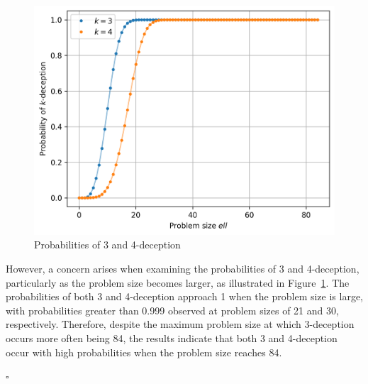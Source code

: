 \documentclass{article}
\begin{document}
\begin{enumerate}[label=(\alph*)]
            \begin{figure}[ht]
                  \centering
                  \includegraphics[width=0.7\linewidth]{fig-deception.png}
                  \caption{Probabilities of 3 and 4-deception}
                  \label{fig:deception_prob}
            \end{figure}

            However, a concern arises when examining the probabilities of 3 and 4-deception, particularly 
            as the problem size becomes larger, as illustrated in Figure~\ref{fig:deception_prob}. 
            The probabilities of both 3 and 4-deception approach 1 when the problem size is large, with probabilities greater 
            than 0.999 observed at problem sizes of 21 and 30, respectively. 
            Therefore, despite the maximum problem size at which 3-deception occurs more often being 84, the results indicate that 
            both 3 and 4-deception occur with high probabilities when the problem size reaches 84.
            

            \hfill $\square$

\end{enumerate}

\vspace{5em}
\end{document}
